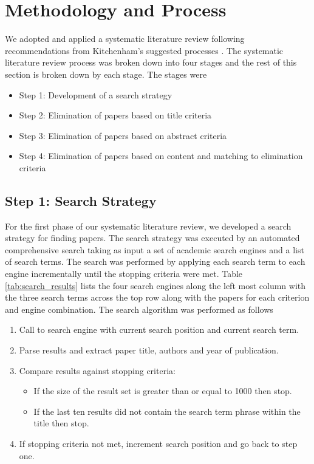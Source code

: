 \section{Methodology and Process} \label{sec:process}

We adopted and applied a systematic literature review following recommendations from Kitchenham's suggested processes \cite{kitchenham2007guidelines}.  The systematic literature review process was broken down into four stages and the rest of this section is broken down by each stage.  The stages were

\begin{itemize}
\setlength{\itemsep}{0.25pt}
\item Step 1: Development of a search strategy
\item Step 2: Elimination of papers based on title criteria
\item Step 3: Elimination of papers based on abstract criteria
\item Step 4: Elimination of papers based on content and matching to elimination criteria
\end{itemize}

\subsection{Step 1: Search Strategy}

For the first phase of our systematic literature review, we developed a search strategy for finding papers.  The search strategy was executed by an automated comprehensive search taking as input a set of academic search engines and a list of search terms.  The search was performed by applying each search term to each engine incrementally until the stopping criteria were met. Table \ref{tab:search_results} lists the four search engines along the left most column with the three search terms across the top row along with the papers for each criterion and engine combination.  The search algorithm was performed as follows

\begin{enumerate}
\setlength{\itemsep}{0.25pt}
\item Call to search engine with current search position and current search term.
\item Parse results and extract paper title, authors and year of publication.
\item Compare results against stopping criteria:
	\begin{itemize}
	\item If the size of the result set is greater than or equal to 1000 then stop.
	\item If the last ten results did not contain the search term phrase within the title then stop.
	\end{itemize}
\item If stopping criteria not met, increment search position and go back to step one.
\end{enumerate}

